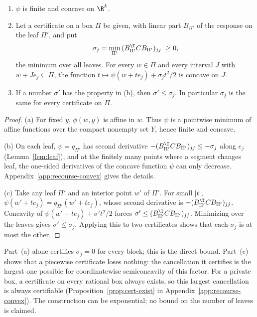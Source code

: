 \begin{proposition}\label{prop:vf-curv}
\begin{enumerate}
\item[(a)] $\psi$ is finite and concave on $\R^k$.
\item[(b)] Let a certificate on a box $\Pi$ be given, with linear part
$B_{\Pi'}$ of the response on the leaf $\Pi'$, and put
\[
\sigma_j=\min_{\Pi'}\,(B_{\Pi'}^{\T}CB_{\Pi'})_{jj}\ \ge0,
\]
the minimum over all leaves. For every $w\in\Pi$ and every interval $J$
with $w+Je_j\subseteq\Pi$, the function $t\mapsto\psi(w+te_j)+\sigma_jt^2/2$
is concave on $J$.
\item[(c)] If a number $\sigma'$ has the property in (b), then
$\sigma'\le\sigma_j$. In particular $\sigma_j$ is the same for every
certificate on $\Pi$.
\end{enumerate}
\end{proposition}

\begin{proof}
(a) For fixed $y$, $\phi(w,y)$ is affine in $w$. Thus $\psi$ is a pointwise
minimum of affine functions over the compact nonempty set $Y$, hence finite
and concave.

(b) On each leaf, $\psi=q_{\Pi'}$ has second derivative
$-(B_{\Pi'}^{\T}CB_{\Pi'})_{jj}\le-\sigma_j$ along $e_j$
(Lemma~\ref{lem:leaf}), and at the finitely many points where a segment
changes leaf, the one-sided derivatives of the concave function $\psi$ can
only decrease. Appendix~\ref{app:recourse-convex} gives the details.

(c) Take any leaf $\Pi'$ and an interior point $w'$ of $\Pi'$. For small
$|t|$, $\psi(w'+te_j)=q_{\Pi'}(w'+te_j)$, whose second derivative is
$-(B_{\Pi'}^{\T}CB_{\Pi'})_{jj}$. Concavity of $\psi(w'+te_j)+\sigma't^2/2$
forces $\sigma'\le(B_{\Pi'}^{\T}CB_{\Pi'})_{jj}$. Minimizing over the leaves
gives $\sigma'\le\sigma_j$. Applying this to two certificates shows that
each $\sigma_j$ is at most the other.
\end{proof}

Part~(a) alone certifies $\sigma_j=0$ for every block; this is the direct
bound. Part~(c) shows that a piecewise certificate loses nothing: the
cancellation it certifies is the largest one possible for coordinatewise
semiconcavity of this factor. For a private box, a certificate on every
rational box always exists, so this largest cancellation is always
certifiable (Proposition~\ref{prop:cert-exist} in
Appendix~\ref{app:recourse-convex}). The construction can be exponential; no
bound on the number of leaves is claimed.

